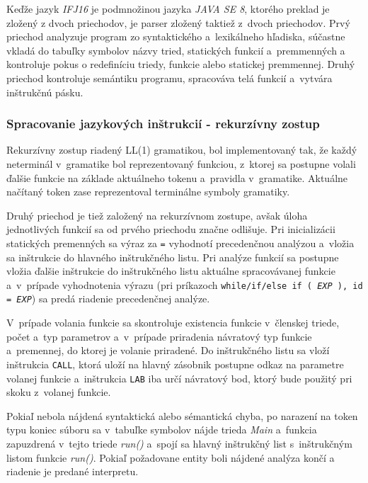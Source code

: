 \documentclass[11pt,a4paper]{article}
\begin{document}
    Keďže jazyk \emph{IFJ16} je podmnožinou jazyka \emph{JAVA SE 8}, ktorého preklad je zložený z dvoch priechodov, je parser zložený
    taktiež z~dvoch priechodov. Prvý priechod analyzuje program zo syntaktického a~lexikálneho hľadiska, súčastne vkladá do tabuľky
    symbolov názvy tried, statických funkcií a~premmenných a kontroluje pokus o redefiníciu triedy, funkcie alebo statickej premmennej.
    Druhý priechod kontroluje semántiku programu, spracováva telá funkcií a~vytvára inštrukčnú pásku.



        \subsubsection{Spracovanie jazykových inštrukcií - rekurzívny zostup}
        \label{rekurzia}
        Rekurzívny zostup riadený LL(1) gramatikou, bol implementovaný tak, že každý neterminál v~gramatike bol reprezentovaný funkciou,
        z~ktorej sa postupne volali ďalšie funkcie na základe aktuálneho tokenu a~pravidla v~gramatike. Aktuálne načítaný token zase reprezentoval
        terminálne symboly gramatiky.

        Druhý priechod je tiež založený na rekurzívnom zostupe, avšak úloha jednotlivých funkcií sa od prvého priechodu značne odlišuje.
        Pri inicializácii statických premenných sa výraz za \texttt{=} vyhodnotí precedenčnou analýzou a~vložia sa inštrukcie do hlavného
        inštrukčného listu. Pri analýze funkcií sa postupne vložia ďalšie inštrukcie do inštrukčného listu aktuálne spracovávanej funkcie
        a~v~prípade vyhodnotenia výrazu (pri príkazoch
        \texttt{while/if/else if ( \emph{EXP} ), id = \emph{EXP}}) sa predá riadenie precedenčnej analýze.

        V~prípade volania funkcie sa skontroluje existencia funkcie v~členskej triede, počet a~typ parametrov a~v~prípade priradenia
        návratový typ funkcie a~premennej, do ktorej je volanie priradené.
        Do inštrukčného listu sa vloží inštrukcia \texttt{CALL}, ktorá uloží na hlavný zásobnik postupne odkaz na parametre
        volanej funkcie a~inštrukcia \texttt{LAB} iba určí návratový bod, ktorý bude použitý pri skoku z~volanej funkcie.

        Pokiaľ nebola nájdená syntaktická alebo sémantická chyba, po narazení na token typu koniec súboru sa v~tabuľke symbolov nájde
        trieda \emph{Main} a~funkcia zapuzdrená v~tejto triede \emph{run()} a~spojí sa hlavný inštrukčný list s~inštrukčným listom funkcie
        \emph{run()}. Pokiaľ požadovane entity boli nájdené analýza končí a riadenie je predané interpretu.
\end{document}
